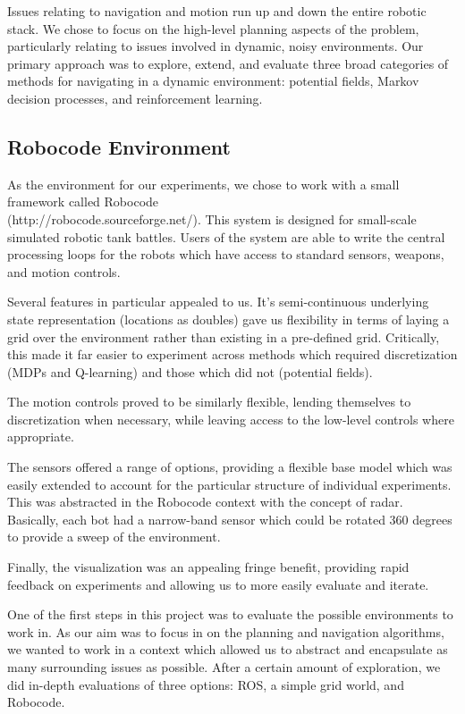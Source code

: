 \documentclass{aiaa-tc}%
\begin{document}
Issues relating to navigation and motion run up and down the entire
robotic stack. We chose to focus on the high-level planning aspects of
the problem, particularly relating to issues involved in dynamic,
noisy environments. Our primary approach was to explore, extend, and
evaluate three broad categories of methods for navigating in a dynamic
environment: potential fields, Markov decision processes, and
reinforcement learning.

\subsection{Robocode Environment}

As the environment for our experiments, we chose to work with a small
framework called Robocode \\(http://robocode.sourceforge.net/). This system is designed for small-scale
simulated robotic tank battles. Users of the system are able to write
the central processing loops for the robots which have access to
standard sensors, weapons, and motion controls. 

Several features in particular appealed to us. It's semi-continuous underlying state
representation (locations as doubles) gave us flexibility in
terms of laying a grid over the environment rather than existing in a
pre-defined grid. Critically, this made it far easier to experiment
across methods which required discretization (MDPs and Q-learning) and
those which did not (potential fields).

The motion controls proved to be similarly flexible, lending
themselves to discretization when necessary, while leaving access to
the low-level controls where appropriate.

The sensors offered a range of options, providing a flexible base
model which was easily extended to account for the particular
structure of individual
experiments. This was abstracted in the Robocode context with the
concept of radar. Basically, each bot had a narrow-band sensor which
could be rotated 360 degrees to provide a sweep of the environment.

Finally, the visualization was an appealing fringe benefit, providing
rapid feedback on experiments and allowing us to more easily evaluate
and iterate.

One of the first steps in this project was to evaluate the possible
environments to work in. As our aim was to focus in on the planning and navigation algorithms,
we wanted to work in a context which allowed us to abstract and
encapsulate as many
surrounding issues as possible. After a certain amount of exploration, we did
in-depth evaluations of three options: ROS, a simple grid world, and
Robocode.
\end{document}
